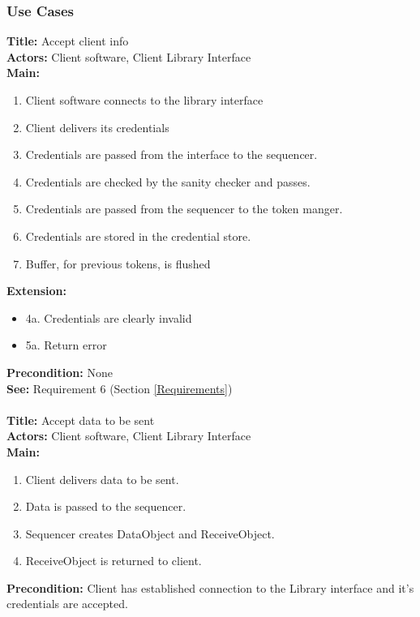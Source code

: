 	\subsubsection{Use Cases}\label{client use cases}
		\textbf{Title:} Accept client info \\
		\textbf{Actors:} Client software, Client Library Interface \\
		\textbf{Main:}
		\begin{enumerate}
			\item Client software connects to the library interface
			\item Client delivers its credentials
			\item Credentials are passed from the interface to the sequencer.
			\item Credentials are checked by the sanity checker and passes.
			\item Credentials are passed from the sequencer to the token manger.
			\item Credentials are stored in the credential store.
			\item Buffer, for previous tokens, is flushed
		\end{enumerate}
		\textbf{Extension:} 
		\begin{itemize}
			  \item[] 4a. Credentials are clearly invalid
			  \item[] 5a. Return error
		\end{itemize}
		\textbf{Precondition:}  None\\
		\textbf{See:} Requirement 6 (Section \ref{Requirements})
		\\\\
		\textbf{Title:} Accept data to be sent \\
		\textbf{Actors:} Client software, Client Library Interface \\
		\textbf{Main:}
		\begin{enumerate}
			\item Client delivers data to be sent.
			\item Data is passed to the sequencer.
			\item Sequencer creates DataObject and ReceiveObject.
			\item ReceiveObject is returned to client.
		\end{enumerate}
		\textbf{Precondition:} Client has established connection to the Library interface and it's credentials are accepted. \\
